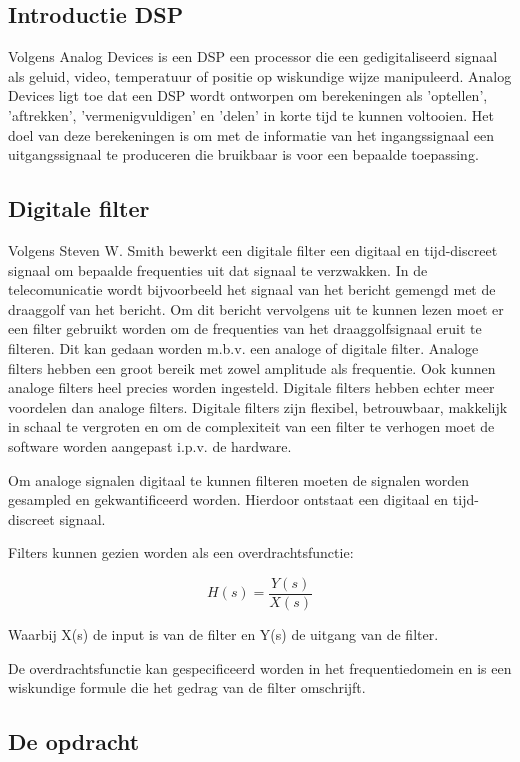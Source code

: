 \documentclass[11pt,a4paper]{article}
\begin{document}
		\subsection{Introductie DSP}
		Volgens Analog Devices \cite{analog} is een DSP een processor die een gedigitaliseerd signaal als geluid, video, temperatuur of positie op wiskundige wijze manipuleerd. Analog Devices ligt toe dat een DSP wordt ontworpen om berekeningen als 'optellen', 'aftrekken', 'vermenigvuldigen' en 'delen' in korte tijd te kunnen voltooien. Het doel van deze berekeningen is om met de informatie van het ingangssignaal een uitgangssignaal te produceren die bruikbaar is voor een bepaalde toepassing. 
		
		\subsection{Digitale filter}
		Volgens Steven W. Smith \cite{DSPguide} bewerkt een digitale filter een digitaal en tijd-discreet signaal om bepaalde frequenties uit dat signaal te verzwakken. In de telecomunicatie wordt bijvoorbeeld het signaal van het bericht gemengd met de draaggolf van het bericht. Om dit bericht vervolgens uit te kunnen lezen moet er een filter gebruikt worden om de frequenties van het draaggolfsignaal eruit te filteren. Dit kan gedaan worden m.b.v. een analoge of digitale filter. Analoge filters hebben een groot bereik met zowel amplitude als frequentie. Ook kunnen analoge filters heel precies worden ingesteld. Digitale filters hebben echter meer voordelen dan analoge filters. Digitale filters zijn flexibel, betrouwbaar, makkelijk in schaal te vergroten en om de complexiteit van een filter te verhogen moet de software worden aangepast i.p.v. de hardware. 
		
Om analoge signalen digitaal te kunnen filteren moeten de signalen worden gesampled en gekwantificeerd worden. Hierdoor ontstaat een digitaal en tijd-discreet signaal. 

Filters kunnen gezien worden als een overdrachtsfunctie:
 
\[
    H(s) = \frac{Y(s)}{X(s)}
\]	

Waarbij X(s) de input is van de filter en Y(s) de uitgang van de filter. 

De overdrachtsfunctie kan gespecificeerd worden in het frequentiedomein en is een wiskundige formule die het gedrag van de filter omschrijft.  

		
	\subsection{De opdracht}		
		
\end{document}

